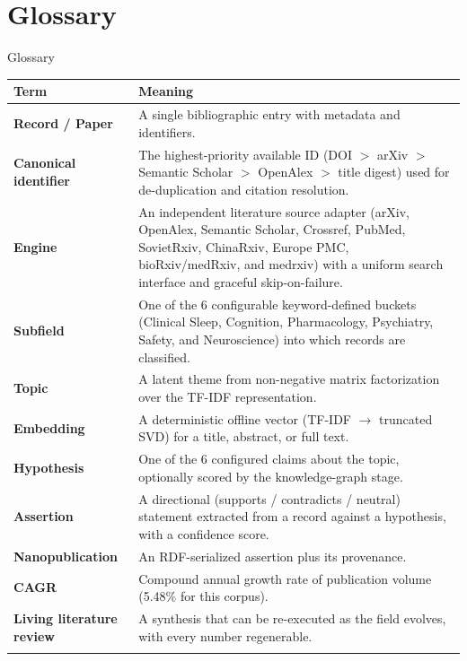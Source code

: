 \documentclass[
  ignorenonframetext,
]{beamer}
\author{\texorpdfstring{}{}}
\date{}
\newcounter{none} %
\begin{document}
\section{Glossary}\label{glossary}

\begin{frame}[allowframebreaks]{Glossary}
{\def\LTcaptype{none} %
\begin{longtable}[]{@{}
  >{\raggedright\arraybackslash}p{}
  >{\raggedright\arraybackslash}p{}@{}}
\toprule\noalign{}
\begin{minipage}[b]{\linewidth}\raggedright
Term
\end{minipage} & \begin{minipage}[b]{\linewidth}\raggedright
Meaning
\end{minipage} \\
\midrule\noalign{}
\endhead
\textbf{Record / Paper} & A single bibliographic entry with metadata and
identifiers. \\
\textbf{Canonical identifier} & The highest-priority available ID (DOI
\(>\) arXiv \(>\) Semantic Scholar \(>\) OpenAlex \(>\) title digest)
used for de-duplication and citation resolution. \\
\textbf{Engine} & An independent literature source adapter (arXiv,
OpenAlex, Semantic Scholar, Crossref, PubMed, SovietRxiv, ChinaRxiv,
Europe PMC, bioRxiv/medRxiv, and medrxiv) with a uniform search
interface and graceful skip-on-failure. \\
\textbf{Subfield} & One of the 6 configurable keyword-defined buckets
(Clinical Sleep, Cognition, Pharmacology, Psychiatry, Safety, and
Neuroscience) into which records are classified. \\
\textbf{Topic} & A latent theme from non-negative matrix factorization
over the TF-IDF representation. \\
\textbf{Embedding} & A deterministic offline vector (TF-IDF
\(\rightarrow\) truncated SVD) for a title, abstract, or full text. \\
\textbf{Hypothesis} & One of the 6 configured claims about the topic,
optionally scored by the knowledge-graph stage. \\
\textbf{Assertion} & A directional (supports / contradicts / neutral)
statement extracted from a record against a hypothesis, with a
confidence score. \\
\textbf{Nanopublication} & An RDF-serialized assertion plus its
provenance. \\
\textbf{CAGR} & Compound annual growth rate of publication volume
(5.48\% for this corpus). \\
\textbf{Living literature review} & A synthesis that can be re-executed
as the field evolves, with every number regenerable. \\
\bottomrule\noalign{}
\end{longtable}
}
\end{frame}
\end{document}
